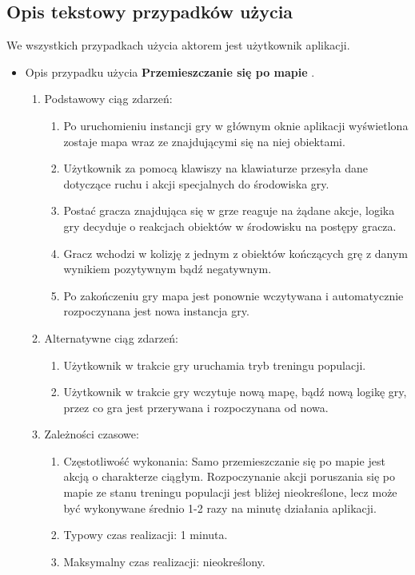 \subsection{Opis tekstowy przypadków użycia}
\begin{par}
	We wszystkich przypadkach użycia aktorem jest użytkownik aplikacji.
	\begin{itemize}

	\item
	Opis przypadku użycia {\bf Przemieszczanie się po mapie }.
	\begin{enumerate}
	\item Podstawowy ciąg zdarzeń:
		\begin{enumerate}
		\item Po uruchomieniu instancji gry w głównym oknie aplikacji wyświetlona zostaje mapa wraz ze znajdującymi się na niej obiektami.
		\item Użytkownik za pomocą klawiszy na klawiaturze przesyła dane dotyczące ruchu i akcji specjalnych do środowiska gry.
		\item Postać gracza znajdująca się w grze reaguje na żądane akcje, logika gry decyduje o reakcjach obiektów w środowisku na postępy gracza.
		\item Gracz wchodzi w kolizję z jednym z obiektów kończących grę z danym wynikiem pozytywnym bądź negatywnym.
		\item Po zakończeniu gry mapa jest ponownie wczytywana i automatycznie rozpoczynana jest nowa instancja gry.
		\end{enumerate}
	\item Alternatywne ciąg zdarzeń:
		\begin{enumerate}
		\item Użytkownik w trakcie gry uruchamia tryb treningu populacji.
		\item Użytkownik w trakcie gry wczytuje nową mapę, bądź nową logikę gry, przez co gra jest przerywana i rozpoczynana od nowa.
		\end{enumerate}
	\item Zależności czasowe:
		\begin{enumerate}
		\item Częstotliwość wykonania: Samo przemieszczanie się po mapie jest akcją o charakterze ciągłym. 
		Rozpoczynanie akcji poruszania się po mapie ze stanu treningu populacji jest bliżej nieokreślone, lecz może być wykonywane średnio 1-2 razy na minutę działania aplikacji.
		\item Typowy czas realizacji: 1 minuta.
		\item Maksymalny czas realizacji: nieokreślony.

\end{enumerate}
\end{enumerate}
\end{itemize}
\end{par}
